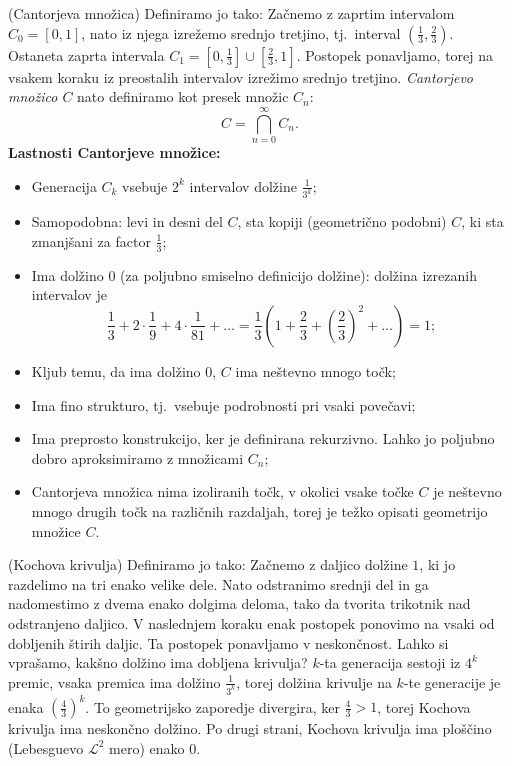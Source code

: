 \begin{primer}(Cantorjeva množica)
    Definiramo jo tako: Začnemo z zaprtim intervalom \(C_0 = [0,1]\), nato iz njega izrežemo srednjo tretjino, tj.\ interval \((\frac{1}{3}, \frac{2}{3})\). Ostaneta zaprta intervala \(C_1 = [0, \frac{1}{3}] \cup [\frac{2}{3}, 1]\). Postopek ponavljamo, torej na vsakem koraku iz preostalih intervalov izrežimo srednjo tretjino. \emph{Cantorjevo množico \(C\)} nato definiramo kot presek množic \(C_n\): \[C = \bigcap_{n = 0}^\infty C_n.\]
    \textbf{Lastnosti Cantorjeve množice:}
    \begin{itemize}
        \item Generacija \(C_k\) vsebuje \(2^k\) intervalov dolžine \(\frac{1}{3^k}\);
        \item Samopodobna: levi in desni del \(C\), sta kopiji (geometrično podobni) \(C\), ki sta zmanjšani za factor \(\frac{1}{3}\);
        \item Ima dolžino \(0\) (za poljubno smiselno definicijo dolžine): dolžina izrezanih intervalov je \[\frac{1}{3} + 2 \cdot \frac{1}{9} + 4 \cdot \frac{1}{81} + \ldots = \frac{1}{3} \left(1 + \frac{2}{3} + \left(\frac{2}{3}\right)^2 + \ldots \right) = 1;\]
        \item Kljub temu, da ima dolžino \(0\), \(C\) ima neštevno mnogo točk;
        \item Ima fino strukturo, tj.\ vsebuje podrobnosti pri vsaki povečavi;
        \item Ima preprosto konstrukcijo, ker je definirana rekurzivno. Lahko jo poljubno dobro aproksimiramo z množicami \(C_n\);
        \item Cantorjeva množica nima izoliranih točk, v okolici vsake točke \(C\) je neštevno mnogo drugih točk na različnih razdaljah, torej je težko opisati geometrijo množice \(C\).
    \end{itemize}
\end{primer}

\begin{primer}(Kochova krivulja)
    Definiramo jo tako: Začnemo z daljico dolžine \(1\), ki jo razdelimo na tri enako velike dele. Nato odstranimo srednji del in ga nadomestimo z dvema enako dolgima deloma, tako da tvorita trikotnik nad odstranjeno daljico.
    V naslednjem koraku enak postopek ponovimo na vsaki od dobljenih štirih daljic. Ta postopek ponavljamo v neskončnost. Lahko si vprašamo, kakšno dolžino ima dobljena krivulja?    
    \(k\)-ta generacija sestoji iz \(4^k\) premic, vsaka premica ima dolžino \(\frac{1}{3^k}\), torej dolžina krivulje na \(k\)-te generacije je enaka \(\left(\frac{4}{3}\right)^k\). To geometrijsko zaporedje divergira, ker \(\frac{4}{3} > 1\), torej Kochova krivulja ima neskončno dolžino. Po drugi strani, Kochova krivulja ima ploščino (Lebesguevo \(\mathcal{L}^2\) mero) enako \(0\).
\end{primer}

